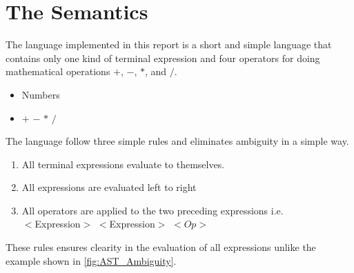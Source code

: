 \section{The Semantics}
The language implemented in this report is a short and simple language
that contains only one kind of terminal expression and four operators
for doing mathematical operations $+$, $-$, $*$, and $/$.

\begin{itemize}
  \item Numbers
  \item $+$ \textbar{} $-$ \textbar{} $*$ \textbar{} $/$
\end{itemize}

\noindent The language follow three simple rules and eliminates ambiguity
in a simple way. 

\begin{enumerate}
  \item All terminal expressions evaluate to themselves.
  \item All expressions are evaluated left to right
  \item All operators are applied to the two preceding expressions i.e.\\
    $<$Expression$>$ $<$Expression$>$ $<Op>$
\end{enumerate}

These rules ensures clearity in the evaluation of all expressions unlike the
example shown in \autoref{fig:AST_Ambiguity}.

